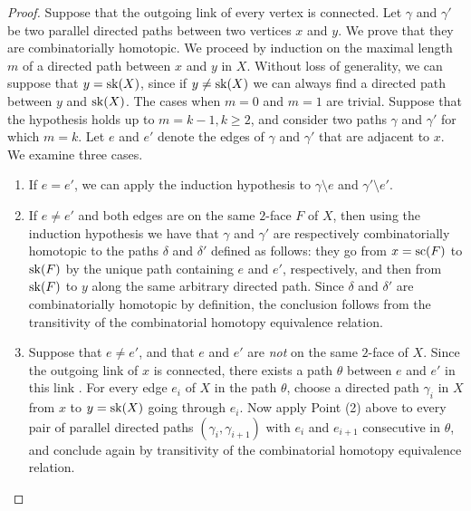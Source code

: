 \begin{proof}
    Suppose that the outgoing link of every vertex is  connected. 
    Let $\gamma$ and $\gamma'$ be two parallel directed paths between two vertices $x$ and $y$. 
    We prove that they are combinatorially homotopic. 
    We proceed by induction on the maximal length $m$ of a directed path between $x$ and $y$ in $X$. 
    Without loss of generality, we can suppose that $y=\mathrm{sk}(X)$, since if $y\neq\mathrm{sk}(X)$ we can always find a directed path between $y$ and $\mathrm{sk}(X)$.
    The cases when $m=0$ and $m=1$ are trivial. 
    Suppose that the hypothesis holds up to $m=k-1, k\geq 2$, and consider two paths $\gamma$ and $\gamma'$ for which $m=k$. 
    Let $e$ and $e'$ denote the edges of $\gamma$ and $\gamma'$ that are adjacent to $x$. 
    We examine three cases.
    \begin{enumerate}
        \item If $e=e'$, we can apply the induction hypothesis to $\gamma \setminus e$ and $\gamma' \setminus e'$. 
        \item If $e \neq e'$ and both edges are on the same $2$-face $F$ of $X$, then using the induction hypothesis we have that $\gamma$ and $\gamma'$ are respectively combinatorially homotopic to the paths $\delta$ and $\delta'$ defined as follows: they go from $x=\mathrm{sc}(F)$ to $\mathrm{sk}(F)$ by the unique path containing $e$ and $e'$, respectively, and then from $\mathrm{sk}(F)$ to $y$ along the same arbitrary directed path. 
        Since $\delta$ and $\delta'$ are combinatorially homotopic by definition, the conclusion follows from the transitivity of the combinatorial homotopy equivalence relation. 
        \item Suppose that $e\neq e'$, and that $e$ and $e'$ are \emph{not} on the same $2$-face of $X$. 
        Since the outgoing link of $x$ is  connected, there exists a  path $\theta$ between  $e$ and $e'$ in this link . 
        For every edge $e_i$ of $X$ in the path $\theta$, choose a directed path $\gamma_i$ in $X$ from $x$ to $y=\mathrm{sk}(X)$ going through $e_i$. 
        Now apply Point (2) above to every pair of parallel directed paths $(\gamma_i, \gamma_{i+1})$ with $e_i$ and $e_{i+1}$ consecutive in $\theta$, and conclude again by transitivity of the combinatorial homotopy equivalence relation. 
    \end{enumerate}


\end{proof}
